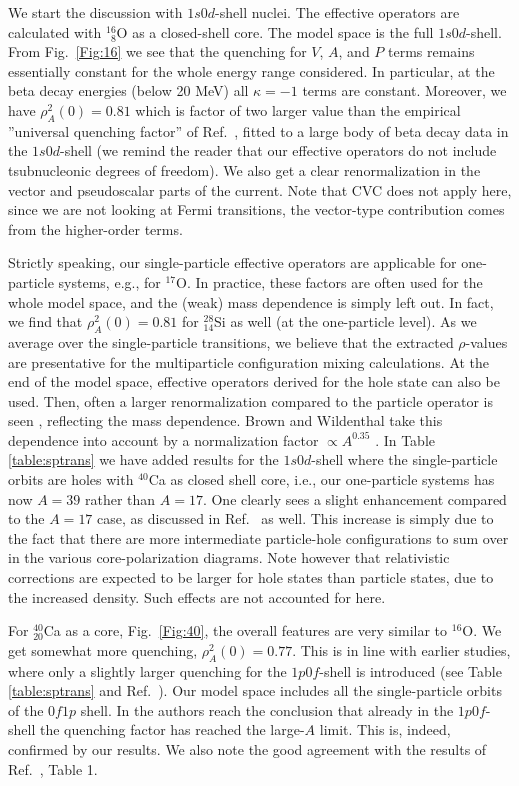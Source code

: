 We start the discussion with $1s0d$-shell nuclei. The effective operators 
are calculated with $^{16}_{\phantom{1}8}$O as a closed-shell core. 
The model space is the full $1s0d$-shell.  From
Fig.\ \ref{Fig:16} we see that the quenching for $V$, $A$, and $P$ terms
remains essentially constant for the whole energy range considered. In
particular, at the beta decay energies (below 20 MeV) all $\kappa=-1$
terms are constant. Moreover, we have
$\rho^2_A(0)=0.81$ which is factor of two larger value than the empirical 
''universal
quenching factor'' of Ref.\ \cite{bro88}, fitted to a large body of
beta decay data in the $1s0d$-shell (we remind the reader that our effective
operators do not include tsubnucleonic degrees of freedom). We also get a
clear renormalization in the vector and pseudoscalar parts of the current.
Note that CVC does not apply here, since we are not looking at
Fermi transitions, the vector-type contribution comes from the higher-order
terms. 

Strictly speaking, our single-particle effective operators are applicable 
for one-particle
systems, e.g., for $^{17}$O. In practice, these factors are often
used for the whole
model space, and the (weak) mass dependence is simply left out.
In fact, we find that $\rho_A^2(0)=0.81$ for $^{28}_{14}$Si as well 
(at the one-particle level). As we average over the single-particle
transitions, we believe that the extracted $\rho$-values are presentative for
the multiparticle configuration mixing calculations. At the end of
the model space, effective operators derived for the hole state can also be
used. Then, often a larger renormalization compared to the particle operator
is seen \cite{tow87}, reflecting the mass dependence. Brown and Wildenthal
take this dependence into account by a normalization factor $\propto A^{0.35}$ 
\cite{bro87}. In Table \ref{table:sptrans} we have added results for the 
$1s0d$-shell where the single-particle orbits are holes with 
$^{40}$Ca as closed shell core, i.e., our one-particle systems has now
$A=39$ rather than $A=17$. One clearly sees a slight enhancement compared
to the $A=17$ case, 
as discussed in Ref.~\cite{tow87} as well. This increase is simply due to the 
fact that there are more intermediate particle-hole configurations
to sum over in the various core-polarization diagrams. Note however that
relativistic corrections are expected to be larger for hole states
than particle states, due to the increased density. Such effects are
not accounted for here.  

For $^{40}_{20}$Ca as a core, Fig.\ \ref{Fig:40}, the overall features are 
very similar to $^{16}$O. We get somewhat  more quenching, $\rho^2_A(0)=0.77$. 
This is in line with earlier studies, where only a slightly larger
quenching for the $1p0f$-shell is introduced (see Table \ref{table:sptrans} and 
Ref.\ \cite{mar96}). 
Our model space includes all the single-particle orbits of the $0f1p$ shell. 
In \cite{mar96} the authors reach the conclusion that already
in the $1p0f$-shell the quenching factor has reached the large-$A$ limit. This
is, indeed, confirmed by our results. We also note the good agreement
with the results of Ref.\ \cite{tow94}, Table 1. 

